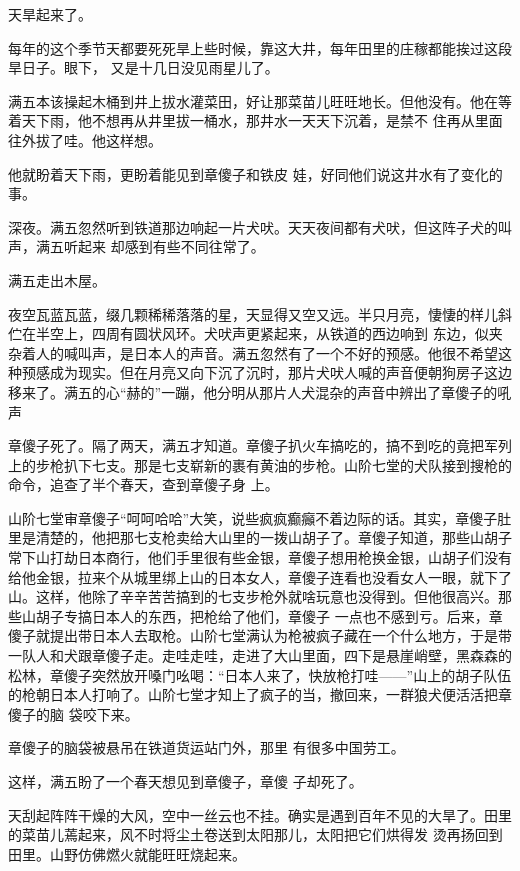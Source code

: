 \documentclass{article}
\begin{document}
天旱起来了。 

\newpage

每年的这个季节天都要死死旱上些时候，靠这大井，每年田里的庄稼都能挨过这段旱日子。眼下，
又是十几日没见雨星儿了。 

满五本该操起木桶到井上拔水灌菜田，好让那菜苗儿旺旺地长。但他没有。他在等着天下雨，他不想再从井里拔一桶水，那井水一天天下沉着，是禁不
住再从里面往外拔了哇。他这样想。 

他就盼着天下雨，更盼着能见到章傻子和铁皮
娃，好同他们说这井水有了变化的事。 

深夜。满五忽然听到铁道那边响起一片犬吠。天天夜间都有犬吠，但这阵子犬的叫声，满五听起来
却感到有些不同往常了。 


满五走出木屋。 

夜空瓦蓝瓦蓝，缀几颗稀稀落落的星，天显得又空又远。半只月亮，悽悽的样儿斜伫在半空上，四周有圆状风环。犬吠声更紧起来，从铁道的西边响到
\newpage
东边，似夹杂着人的喊叫声，是日本人的声音。满五忽然有了一个不好的预感。他很不希望这种预感成为现实。但在月亮又向下沉了沉时，那片犬吠人喊的声音便朝狗房子这边移来了。满五的心“赫的”一蹦，他分明从那片人犬混杂的声音中辨出了章傻子的吼声

章傻子死了。隔了两天，满五才知道。章傻子扒火车搞吃的，搞不到吃的竟把军列上的步枪扒下七支。那是七支崭新的裹有黄油的步枪。山阶七堂的犬队接到搜枪的命令，追查了半个春天，查到章傻子身
上。 

山阶七堂审章傻子“呵呵哈哈”大笑，说些疯疯癫癲不着边际的话。其实，章傻子肚里是清楚的，他把那七支枪卖给大山里的一拨山胡子了。章傻子知道，那些山胡子常下山打劫日本商行，他们手里很有些金银，章傻子想用枪换金银，山胡子们没有给他金银，拉来个从城里绑上山的日本女人，章傻子连看也没看女人一眼，就下了山。这样，他除了辛辛苦苦搞到的七支步枪外就啥玩意也没得到。但他很高兴。那些山胡子专搞日本人的东西，把枪给了他们，章傻子
\newpage
一点也不感到亏。后来，章傻子就提出带日本人去取枪。山阶七堂满认为枪被疯子藏在一个什么地方，于是带一队人和犬跟章傻子走。走哇走哇，走进了大山里面，四下是悬崖峭壁，黑森森的松林，章傻子突然放开嗓门吆喝：“日本人来了，快放枪打哇——”山上的胡子队伍的枪朝日本人打响了。山阶七堂才知上了疯子的当，撤回来，一群狼犬便活活把章傻子的脑
袋咬下来。 

章傻子的脑袋被悬吊在铁道货运站门外，那里
有很多中国劳工。 

这样，满五盼了一个春天想见到章傻子，章傻
子却死了。 

天刮起阵阵干燥的大风，空中一丝云也不挂。确实是遇到百年不见的大旱了。田里的菜苗儿蔫起来，风不时将尘土卷送到太阳那儿，太阳把它们烘得发
烫再扬回到田里。山野仿佛燃火就能旺旺烧起来。 
\end{document}
